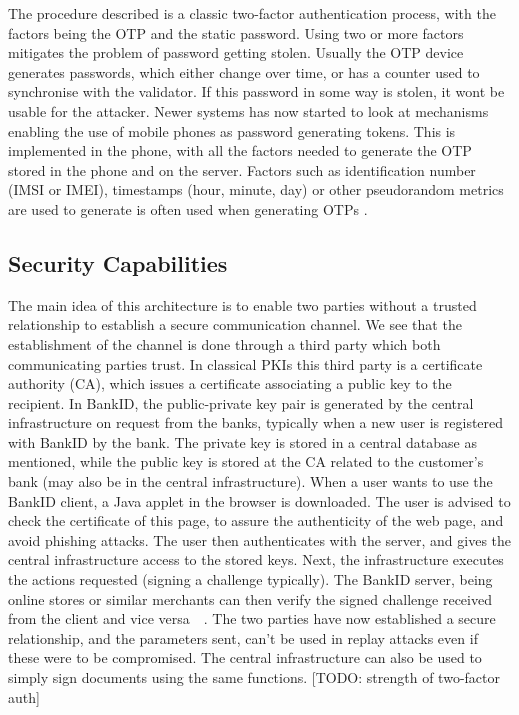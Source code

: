 \documentclass[a4paper,11pt]{article}
\begin{document}
The procedure described is a classic two-factor authentication process, with the factors being the OTP and the static password. Using two or more factors mitigates the problem of password getting stolen. Usually the OTP device generates passwords, which either change over time, or has a counter used to synchronise with the validator. If this password in some way is stolen, it wont be usable for the attacker. Newer systems has now started to look at mechanisms enabling the use of mobile phones as password generating tokens. This is implemented in the phone, with all the factors needed to generate the OTP stored in the phone and on the server. Factors such as identification number (IMSI or IMEI), timestamps (hour, minute, day) or other pseudorandom metrics are used to generate is often used when generating OTPs \cite{bankidmobil}.




\subsection{Security Capabilities}
 The main idea of this architecture is to enable two parties without a trusted relationship to establish a secure communication channel. We see that the establishment of the channel is done through a third party which both communicating parties trust. In classical PKIs this third party is a certificate authority (CA), which issues a certificate associating a public key to the recipient. In BankID, the public-private key pair is generated by the central infrastructure on request from the banks, typically when a new user is registered with BankID by the bank. The private key is stored in a central database as mentioned, while the public key is stored at the CA related to the customer's bank (may also be in the central infrastructure). When a user wants to use the BankID client, a Java applet in the browser is downloaded. The user is advised to check the certificate of this page, to assure the authenticity of the web page, and avoid phishing attacks. The user then authenticates with the server, and gives the central infrastructure access to the stored keys. Next, the infrastructure executes the actions requested (signing a challenge typically). The BankID server, being online stores or similar merchants can then verify the signed challenge received from the client and vice versa~\cite{auth-banking2}~\cite{bankid}. The two parties have now established a secure relationship, and the parameters sent, can't be used in replay attacks even if these were to be compromised. The central infrastructure can also be used to simply sign documents using the same functions. [TODO: strength of two-factor auth]  
\end{document}
